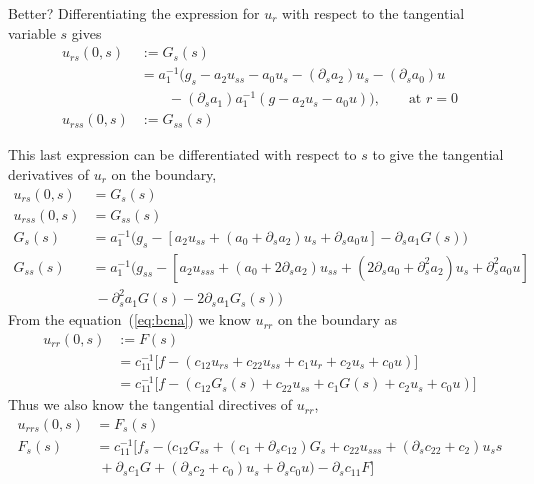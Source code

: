 Better? Differentiating the expression for $u_r$ with respect to the tangential variable $s$
gives 
\begin{align}
   u_{rs}(0,s) & := G_s(s) \\
               & = a_1^{-1} \Big( g_s - a_2 u_{ss} - a_0 u_s - (\partial_s a_2) u_s - (\partial_s a_0) u \\
               &\qquad      -(\partial_s a_1) a_1^{-1} ( g - a_2 u_s - a_0 u ) \Big),  \qquad \mbox{at $r=0$} \\
   u_{rss}(0,s) & := G_{ss}(s)
\end{align}

This last expression can be differentiated with respect to $s$ to give
the tangential derivatives of $u_r$ on the boundary,
\begin{align}
   u_{rs}(0,s) & = G_s(s) \\
   u_{rss}(0,s) & = G_{ss}(s) \\
   G_s(s) &= a_1^{-1}\Big( g_s - [ a_2 u_{ss}+(a_0+\partial_s a_2)u_s + \partial_s a_0 u]
                               -\partial_s a_1 G(s) \Big)  \\
   G_{ss}(s) &= a_1^{-1}\Big( 
                  g_{ss} - [ a_2 u_{sss}+(a_0+2\partial_s a_2)u_{ss} 
                           +(2\partial_s a_0+\partial_s^2 a_2)u_s+ \partial_s^2 a_0 u] \\
             &~                  -\partial_s^2 a_1 G(s) - 2 \partial_s a_1 G_s(s) \Big)  
\end{align}
From the equation~(\ref{eq:bcna}) we know $u_{rr}$ on the boundary as
\begin{align}
u_{rr}(0,s) & := F(s) \\
            & = c_{11}^{-1} \Big[ f - (c_{12} u_{rs} + c_{22} u_{ss} + c_1 u_r + c_2 u_s + c_0 u) \Big] \\
            & = c_{11}^{-1} \Big[ f - (c_{12} G_s(s) + c_{22} u_{ss} + c_1 G(s) + c_2 u_s + c_0 u) \Big]  
\end{align}
Thus we also know the tangential directives of $u_{rr}$,
\begin{align}
u_{rrs}(0,s) & = F_s(s) \\
  F_s(s) & = c_{11}^{-1} \Big[ f_s - \Big(c_{12} G_{ss} + (c_1+\partial_s c_{12})G_s
           + c_{22} u_{sss} + (\partial_s c_{22}+c_2)u_ss \\
         &~ +\partial_s c_1 G + 
             (\partial_s c_2 + c_0) u_s + \partial_s c_0 u\Big) -\partial_s c_{11} F \Big]
\end{align}

